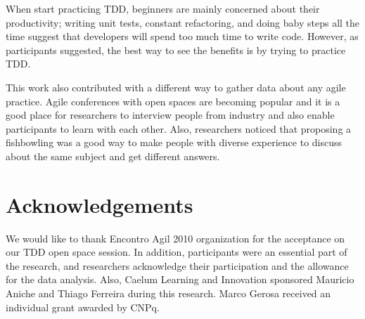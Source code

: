 When start practicing TDD, beginners are mainly concerned about their
productivity; writing unit tests, constant refactoring, and doing baby steps all
the time suggest that developers will spend too much time to write code.
However, as participants suggested, the best way to see the benefits is by
trying to practice TDD.

This work also contributed with a different way to gather data about any agile
practice. Agile conferences with open spaces are becoming popular and it is a
good place for researchers to interview people from industry and also enable
participants to learn with each other. Also, researchers noticed that proposing
a fishbowling was a good way to make people with diverse experience to discuss
about the same subject and get different answers.

\section{Acknowledgements}

We would like to thank Encontro Agil 2010 organization for the acceptance on our
TDD open space session. In addition, participants were an essential part of the
research, and researchers acknowledge their participation and the allowance for
the data analysis.
Also, Caelum Learning and Innovation sponsored Mauricio Aniche and Thiago
Ferreira during this research. Marco Gerosa received an individual grant
awarded by CNPq.


